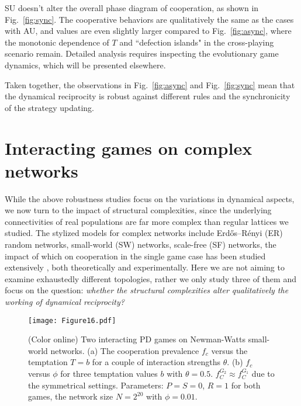 \documentclass[showpacs,superscriptaddress,reprint,nofootinbib,amsmath,amssymb,aps,pre]{revtex4-1}
\begin{document}
SU doesn't alter the overall phase diagram of cooperation, as shown in Fig.~\ref{fig:sync}. The cooperative behaviors are qualitatively the same as the cases with AU, and values are even slightly larger compared to Fig.~\ref{fig:async}, where the monotonic dependence of $T$ and ``defection islands" in the cross-playing scenario remain. Detailed analysis requires inspecting the evolutionary game dynamics, which will be presented elsewhere. 

Taken together, the observations in Fig.~\ref{fig:async}  and Fig.~\ref{fig:sync} mean that the dynamical reciprocity is robust against different rules and the synchronicity of the strategy updating. 

\section{Interacting games on complex networks}\label{sec:networks}
While the above robustness studies focus on the variations in dynamical aspects, we now turn to the impact of structural complexities, since the underlying connectivities of real populations are far more complex than regular lattices we studied. The stylized models for complex networks include Erd\H{o}s--R\'enyi (ER) random networks, small-world (SW) networks, scale-free (SF) networks, the impact of which on cooperation in the single game case has been studied extensively \cite{szabo2007evolutionary}, both theoretically and experimentally. Here we are not aiming to examine exhaustedly different topologies, rather we only study three of them and focus on the question: \emph{whether the structural complexities alter qualitatively the working of dynamical reciprocity?}

\begin{figure}[t]
\centering
\texttt{[image: Figure16.pdf]}
\caption{(Color online)
Two interacting PD games on Newman-Watts small-world networks.
(a) The cooperation prevalence $f_c$ versus the temptation $T=b$ for a couple of interaction strengths $\theta$. 
(b) $f_c$ versus $\phi$ for three temptation values $b$ with $\theta=0.5$.
$f^{G_2}_C\approx f^{G_1}_C$ due to the symmetrical settings.
Parameters: $P=S=0$, $R=1$ for both games, the network size $N=2^{20}$ with $\phi=0.01$.
}
\label{fig:NW}
\end{figure}
\end{document}
